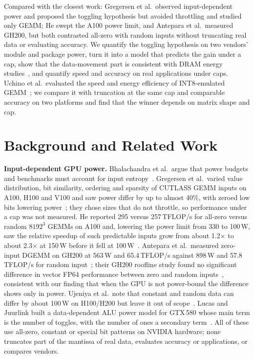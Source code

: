 \documentclass[conference]{IEEEtran}
\newcommand{\W}{\,W}
\newcommand{\pct}{\%}
\begin{document}
Compared with the closest work: Gregersen et al.\ observed input-dependent power and proposed the toggling
hypothesis but avoided throttling and studied only GEMM; He swept the A100 power limit, and Antepara et al.\
measured GH200, but both contrasted all-zero with random inputs without truncating real data or evaluating
accuracy. We quantify the toggling hypothesis on two vendors' module and package power, turn it into a model that
predicts the gain under a cap, show that the data-movement part is consistent with DRAM energy
studies~\cite{Chatterjee2017,Ghose2018}, and quantify speed and accuracy on real applications under caps. Uchino et
al.\ evaluated the speed and energy efficiency of INT8-emulated GEMM~\cite{Uchino2025}; we compare it with truncation
at the same cap and comparable accuracy on two platforms and find that the winner depends on matrix shape and cap.

\section{Background and Related Work}\label{sec:related}

\textbf{Input-dependent GPU power.} Bhalachandra et al.\ argue that power budgets and benchmarks must account for
input entropy~\cite{Bhalachandra2022}. Gregersen et al.\ varied value distribution, bit similarity, ordering and
sparsity of CUTLASS GEMM inputs on A100, H100 and V100 and saw power differ by up to almost 40\pct, with zeroed
low bits lowering power~\cite{Gregersen2024}; they chose sizes that do not throttle, so performance under a cap
was not measured. He reported 295 versus 257\,TFLOP/s for all-zero versus random $8192^3$ GEMMs on A100 and, lowering
the power limit from 330 to 100\W, saw the relative speedup of such predictable inputs grow from about 1.2$\times$ to
about 2.3$\times$ at 150\W{} before it fell at 100\W~\cite{He2024}. Antepara et al.\ measured zero-input DGEMM on
GH200 at 563\W{} and 65.4\,TFLOP/s against 898\W{} and 57.8\,TFLOP/s for random input~\cite{Antepara2025}; their
GH200 roofline study found no significant difference in vector FP64 performance between zero and random
inputs~\cite{Antepara2025W}, consistent with our finding that when the GPU is not power-bound the difference shows
only in power. Ujeniya et al.\ note that constant and random data can differ
by about 100\W{} on H100/H200 but leave it out of scope~\cite{Ujeniya2026}. Lucas and Juurlink built a
data-dependent ALU power model for GTX\,580 whose main term is the number of toggles, with the number of ones a
secondary term~\cite{Lucas2016}. All of these use all-zero, constant or special bit patterns on NVIDIA hardware; none
truncates part of the mantissa of real data, evaluates accuracy or applications, or compares vendors.
\end{document}
